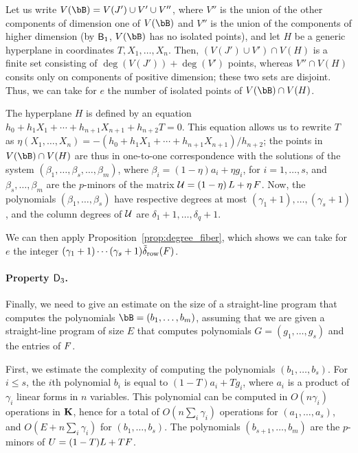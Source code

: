 \documentclass[12pt]{article}
\begin{document}
Let us write $V(\bB)=V(J') \cup V' \cup V''$, where $V''$ is the union
of the other components of dimension one of $V(\bB)$ and $V''$ is the
union of the components of higher dimension (by $\mathsf{B}_1$, $V(\bB)$
has no isolated points), and let $H$ be a generic hyperplane in
coordinates $T,X_1,\dots,X_n$. Then, $(V(J') \cup V') \cap V(H)$ is a
finite set consisting of $\deg(V(J')) + \deg(V')$ points, whereas $V''
\cap V(H)$ consits only on components of positive dimension; these two
sets are disjoint. Thus, we can take for $e$ the number of isolated 
points of $V(\bB)\cap V(H)$.

The hyperplane $H$ is defined by an equation $h_0 + h_1 X_1 + \cdots +
h_{n+1}X_{n+1} + h_{n+2} T=0$. This equation allows us to rewrite $T$
as $\eta(X_1,\dots,X_n)=-(h_0 + h_1 X_1 + \cdots +
h_{n+1}X_{n+1})/h_{n+2}$; the points in $V(\bB)\cap V(H)$ are thus in
one-to-one correspondence with the solutions of the system
$(\beta_1,\dots,\beta_s,\dots,\beta_m)$, where $\beta_i=(1-\eta) a_i +
\eta g_i$, for $i=1,\dots,s$, and $\beta_s,\dots,\beta_m$ are the
$p$-minors of the matrix ${\cal U}=(1-\eta)\, {L} + \eta \, {F} $.  Now, the
polynomials $(\beta_1,\dots,\beta_s)$ have respective degrees at most
$(\gamma_1+1),\dots,(\gamma_s+1)$, and the column degrees of 
${\cal U}$ are $\delta_1+1,\dots,\delta_q+1$. 

We can then apply Proposition~\ref{prop:degree_fiber}, which shows we
can take for $e$ the integer $(\gamma_1+1)\cdots(\gamma_s+1)
\tilde\delta_{\rm row}({F})$.

\paragraph{Property $\mathsf{D}_3$.} Finally, we need to give an estimate on
the size of a straight-line program that computes the polynomials
$\bB=(b_1,\dots,b_m)$, assuming that we are given a straight-line
program of size $E$ that computes polynomials $G=(g_1,\dots,g_s)$ and
the entries of ${F}$.

First, we estimate the complexity of computing the polynomials
$(b_1,\dots,b_s)$. For $i \le s$, the $i$th polynomial $b_i$ is equal
to $(1-T)a_i + T g_i$, where $a_i$ is a product of $\gamma_i$ linear
forms in $n$ variables. This polynomial can be computed in $O(n
\gamma_i)$ operations in $\mathbf{K}$, hence for a total of $O(n \sum_i
\gamma_i)$ operations for $(a_1,\dots,a_s)$, and $O(E+n \sum_i
\gamma_i)$ for $(b_1,\dots,b_s)$. The polynomials
$(b_{s+1},\dots,b_m)$ are the $p$-minors of ${U}=(1-T){L}+T{F}$.
\end{document}
